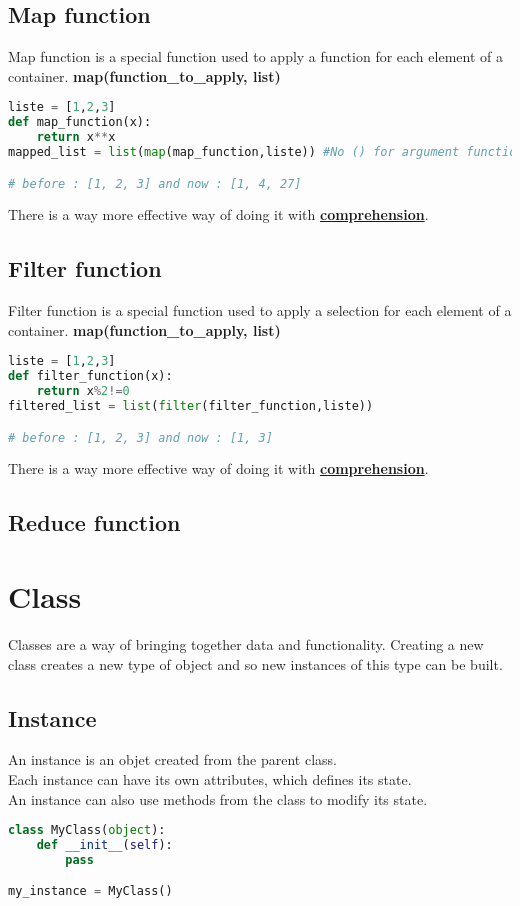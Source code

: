 \documentclass[a4paper, 12pt, titlepage]{scrartcl} %
\begin{document}
\subsection{Map function}
Map function is a special function used to apply a function for each element of a container. \textbf{map(function\_to\_apply, list)}
\begin{lstlisting}[language=Python]
liste = [1,2,3]
def map_function(x):
	return x**x
mapped_list = list(map(map_function,liste)) #No () for argument function

# before : [1, 2, 3] and now : [1, 4, 27]
\end{lstlisting} \vspace{5mm}
There is a way more effective way of doing it with \textbf{\hyperref[Comprehension]{comprehension}}.

\subsection{Filter function}
Filter function is a special function used to apply a selection for each element of a container. \textbf{map(function\_to\_apply, list)}
\begin{lstlisting}[language=Python]
liste = [1,2,3]
def filter_function(x):
	return x%2!=0
filtered_list = list(filter(filter_function,liste))

# before : [1, 2, 3] and now : [1, 3]
\end{lstlisting} \vspace{5mm}
There is a way more effective way of doing it with \textbf{\hyperref[Comprehension]{comprehension}}.

\subsection{Reduce function}


\newpage
\section{Class}
\label{sec:Class}
Classes are a way of bringing together data and functionality. Creating a new class creates a new type of object and so new instances of this type can be built.

\subsection{Instance}
An instance is an objet created from the parent class. \\
Each instance can have its own attributes, which defines its state. \\
An instance can also use methods from the class to modify its state.
\begin{lstlisting}[language=Python]
class MyClass(object):
	def __init__(self):
		pass

my_instance = MyClass()
\end{lstlisting} \vspace{5mm}
\end{document}
